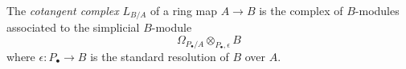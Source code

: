 \begin{definition}
\label{definition-cotangent-complex-ring-map}
The {\it cotangent complex} $L_{B/A}$ of a ring map $A \to B$
is the complex of $B$-modules associated to the simplicial $B$-module
$$
\Omega_{P_\bullet/A} \otimes_{P_\bullet, \epsilon} B
$$
where $\epsilon : P_\bullet \to B$ is the standard resolution
of $B$ over $A$.
\end{definition}